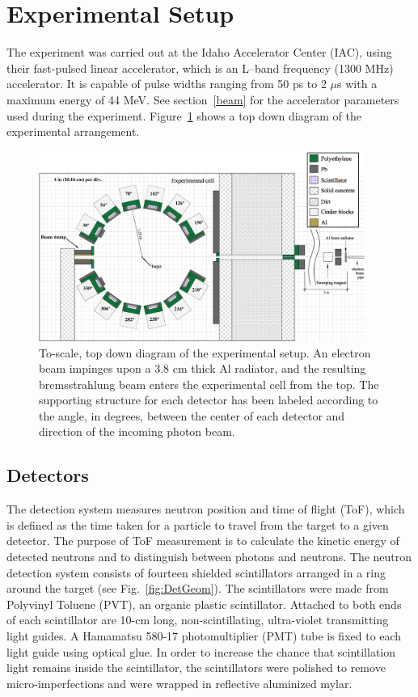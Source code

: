 
\section{Experimental Setup}
The experiment was carried out at the Idaho Accelerator Center (IAC), using their fast-pulsed linear accelerator, which is an L--band frequency (1300 MHz) accelerator.
It is capable of pulse widths ranging from 50 ps to 2 $\mu$s with a maximum energy of 44 MeV.
See section~\ref{beam} for the accelerator parameters used during the experiment.
Figure~\ref{fig:Facility} shows a top down diagram of the experimental arrangement.

\begin{figure}[h]
\centering
\includegraphics[width=0.95\textwidth]{Content/Methods/ExpArangment.jpg}
\caption{To-scale, top down diagram of the experimental setup.
An electron beam impinges upon a 3.8 cm thick Al radiator, and the resulting bremsstrahlung beam enters the experimental cell from the top.
The supporting structure for each detector has been labeled according to the angle, in degrees, between the center of each detector and direction of the incoming photon beam.
}
\label{fig:Facility}
\end{figure}
\subsection{Detectors}
\label{subsection:detectors}
The detection system measures neutron position and time of flight (ToF), which is defined as the time taken for a particle to travel from the target to a given detector.
The purpose of ToF measurement is to calculate the kinetic energy of detected neutrons and to distinguish between photons and neutrons.
The neutron detection system consists of fourteen shielded scintillators arranged in a ring around the target (see Fig.~\ref{fig:DetGeom}).
The scintillators were made from Polyvinyl Toluene (PVT), an organic plastic scintillator.
Attached to both ends of each scintillator are 10-cm long, non-scintillating, ultra-violet transmitting light guides.
A Hamamatsu 580-17 photomultiplier (PMT) tube is fixed to each light guide using optical glue.
In order to increase the chance that scintillation light remains inside the scintillator, the scintillators were polished to remove micro-imperfections and were wrapped in reflective aluminized mylar.

